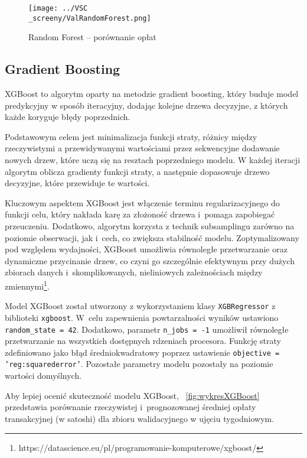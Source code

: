 \documentclass[12pt,a4paper]{report}
\theoremstyle{definition} %
\begin{document}
	\begin{figure}[H]
	    \centering
	    \texttt{[image: ../VSC\\\_screeny/ValRandomForest.png]} 
	    \caption{Random Forest – porównanie opłat}
	    \label{fig:wykresRandomForest}
	\end{figure}
	
	\subsection{Gradient Boosting}
	\hspace*{\parindent}XGBoost to algorytm oparty na metodzie gradient boosting, który buduje model predykcyjny w sposób iteracyjny, dodając kolejne drzewa decyzyjne, z których każde koryguje błędy poprzednich.

	Podstawowym celem jest minimalizacja funkcji straty, różnicy między rzeczywistymi a przewidywanymi wartościami przez sekwencyjne dodawanie nowych drzew, które uczą się na resztach poprzedniego modelu. W każdej iteracji algorytm oblicza gradienty funkcji straty, a następnie dopasowuje drzewo decyzyjne, które przewiduje te wartości.

	Kluczowym aspektem XGBoost jest włączenie terminu regularizacyjnego do funkcji celu, który nakłada karę za złożoność drzewa i~pomaga zapobiegać przeuczeniu. Dodatkowo, algorytm korzysta z technik subsamplingu zarówno na poziomie obserwacji, jak i~cech, co zwiększa stabilność modelu. Zoptymalizowany pod względem wydajności, XGBoost 			umożliwia równoległe przetwarzanie oraz dynamiczne przycinanie drzew, co czyni go szczególnie efektywnym przy dużych zbiorach danych i~skomplikowanych, nieliniowych zależnościach między zmiennymi\footnote{https://datascience.eu/pl/programowanie-komputerowe/xgboost/}.

	Model XGBoost został utworzony z wykorzystaniem klasy \texttt{XGBRegressor} z biblioteki \texttt{xgboost}. W~celu zapewnienia powtarzalności wyników ustawiono \texttt{random\_state = 42}. Dodatkowo, parametr \texttt{n\_jobs = -1} umożliwił równoległe przetwarzanie na wszystkich dostępnych rdzeniach procesora. Funkcję straty zdefiniowano jako błąd średniokwadratowy poprzez ustawienie \texttt{objective = 'reg:squarederror'}. Pozostałe parametry modelu pozostały na poziomie wartości domyślnych.

	Aby lepiej ocenić skuteczność modelu XGBoost, \figurename~\ref{fig:wykresXGBoost} przedstawia porównanie rzeczywistej i~prognozowanej średniej opłaty transakcyjnej (w satoshi) dla zbioru walidacyjnego w ujęciu tygodniowym.	
\end{document}
